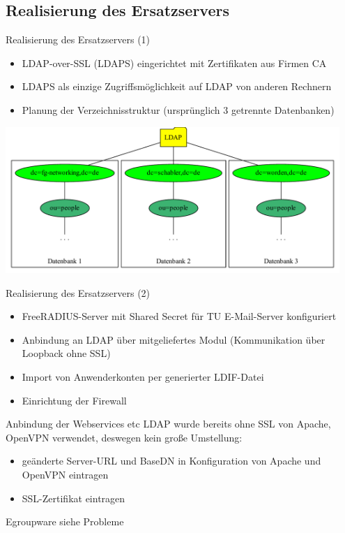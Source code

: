 \documentclass[handout,svgnames]{beamer}
\begin{document}
\subsection{Realisierung des Ersatzservers}
\begin{frame}{Realisierung des Ersatzservers (1)}
\begin{itemize}
	\item LDAP-over-SSL (LDAPS) eingerichtet mit Zertifikaten aus Firmen CA
	\item LDAPS als einzige Zugriffsmöglichkeit auf LDAP von anderen Rechnern
	\item Planung der Verzeichnisstruktur (ursprünglich 3 getrennte Datenbanken)
\end{itemize}
\centering
\includegraphics[width=0.95\textwidth]{Bilder/LDAP-fgn-planned.pdf}
\end{frame}


\begin{frame}{Realisierung des Ersatzservers (2)}
\begin{itemize}
	\item FreeRADIUS-Server mit Shared Secret für TU E-Mail-Server konfiguriert
	\item Anbindung an LDAP über mitgeliefertes Modul (Kommunikation über Loopback ohne SSL)
	\item Import von Anwenderkonten per generierter LDIF-Datei
	\item Einrichtung der Firewall
\end{itemize}
\end{frame}


\begin{frame}{Anbindung der Webservices etc}
LDAP wurde bereits ohne SSL von Apache, OpenVPN verwendet, deswegen kein große Umstellung:
\begin{itemize}
	\item geänderte Server-URL und BaseDN in Konfiguration von Apache und OpenVPN eintragen
	\item SSL-Zertifikat eintragen
\end{itemize}
Egroupware siehe Probleme
\end{frame}
\end{document}
